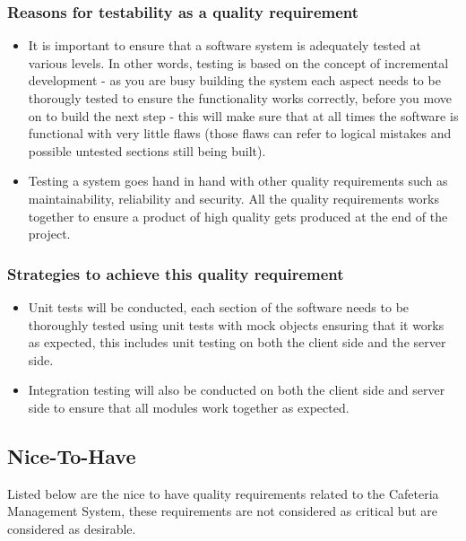 \documentclass[a4paper,12pt]{article}
\begin{document}
\subsubsection{Reasons for testability as a quality requirement}
\begin{itemize}
\item  It is important to ensure that a software system is adequately tested at various levels. In other words, testing is based on the 
concept of incremental development - as you are busy building the system each aspect needs to be thorougly tested to ensure the functionality works correctly, before you move on to build the next step - this will make sure that at all times the software is functional with very little flaws (those flaws can refer to logical mistakes and possible untested sections still being built).
\item Testing a system goes hand in hand with other quality requirements such as maintainability, reliability and security. All the quality requirements works together to ensure a product of high quality gets produced at the end of the project.
\end{itemize}

\subsubsection{Strategies to achieve this quality requirement}
\begin{itemize}
\item Unit tests will be conducted, each section of the software needs to be thoroughly tested using unit tests with mock objects ensuring that it works as expected, this includes unit testing on both the client side and the server side.
\item Integration testing will also be conducted on both the client side and server side to ensure that all modules work together as expected.
\end{itemize}


\subsection{Nice-To-Have}
Listed below are the nice to have quality requirements related to the Cafeteria Management System, these requirements are not considered as critical but are considered as desirable. \\
\end{document}

